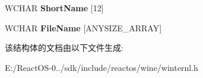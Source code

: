 \begin{DoxyCompactItemize}
\item 
\mbox{\label{struct___f_i_l_e___b_o_t_h___d_i_r_e_c_t_o_r_y___i_n_f_o_r_m_a_t_i_o_n_a8192d4ae19e374b836d73538b126ead9}} 
W\+C\+H\+AR {\bfseries Short\+Name} \mbox{[}12\mbox{]}
\item 
\mbox{\label{struct___f_i_l_e___b_o_t_h___d_i_r_e_c_t_o_r_y___i_n_f_o_r_m_a_t_i_o_n_a753a30235ef903cddd80b17eb00e4336}} 
W\+C\+H\+AR {\bfseries File\+Name} \mbox{[}A\+N\+Y\+S\+I\+Z\+E\+\_\+\+A\+R\+R\+AY\mbox{]}
\end{DoxyCompactItemize}


该结构体的文档由以下文件生成\+:\begin{DoxyCompactItemize}
\item 
E\+:/\+React\+O\+S-\/0../sdk/include/reactos/wine/winternl.\+h\end{DoxyCompactItemize}
